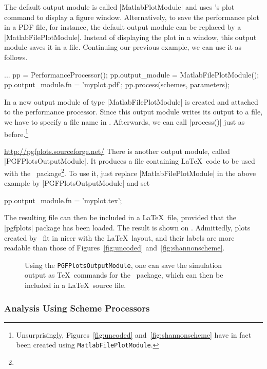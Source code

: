 The default output module is called |MatlabPlotModule| and uses \matlab's plot
command to display a figure window. Alternatively, to save the performance plot
in a PDF file, for instance, the default output module can be replaced by a
|MatlabFilePlotModule|. Instead of displaying the plot in a window, this output
module saves it in a file.  Continuing our previous example, we can use it as
follows.
\begin{Code}
  ...  %
  pp = PerformanceProcessor();
  pp.output_module = MatlabFilePlotModule();
  pp.output_module.fn = 'myplot.pdf';
  pp.process(schemes, parameters);  %
\end{Code}
In  a new output module of type |MatlabFilePlotModule| is
created and attached to the performance processor. Since this output module
writes its output to a file, we have to specify a file name in .
Afterwards, we can call |process()| just as before.\footnote{Unsurprisingly,
Figures~\ref{fig:uncoded} and~\ref{fig:shannonscheme} have in fact been created
using \Verb+Matlab+\-\Verb+FilePlotModule+.}

\urldef{\pgfplotsurl}\url{http://pgfplots.sourceforge.net/}
There is another output module, called |PGFPlotsOutputModule|. It produces a
file containing \LaTeX\ code to be used with the \pgfplots\
package\footnote{\pgfplotsurl}. To use it, just replace |MatlabFilePlotModule|
in the above example by |PGFPlotsOutputModule| and set \eg
\begin{Code}
  pp.output_module.fn = 'myplot.tex';
\end{Code}
The resulting file can then be included in a \LaTeX\ file, provided that the
|pgfplots| package has been loaded.  The result is shown on .
Admittedly, plots created by \pgfplots\ fit in nicer with the \LaTeX\
layout, and their labels are more readable than those of
Figures~\ref{fig:uncoded} and~\ref{fig:shannonscheme}.

\begin{figure}
  \begin{center}
    
  \end{center}
  \caption{Using the \texttt{PGFPlotsOutputModule}, one can save the simulation
  output as \TeX\ commands for the \pgfplots\ package, which can then be
  included in a \LaTeX\ source file.}
  \label{fig:uncodedpgf}
\end{figure}


\subsubsection{Analysis Using Scheme Processors}

